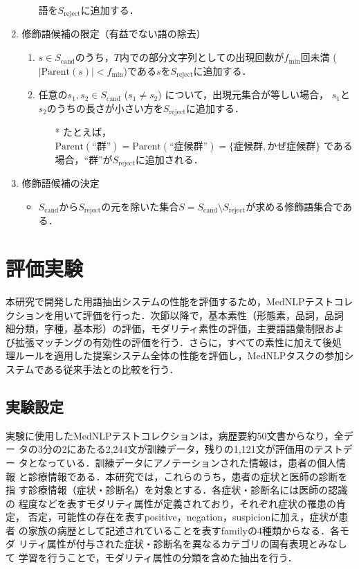\documentclass[japanese]{jnlp_1.4}
\begin{document}
\begin{enumerate}
\begin{enumerate}
	      語を$S_\mathrm{reject}$に追加する．
       \end{enumerate}
 \item 修飾語候補の限定（有益でない語の除去）
       \begin{enumerate}
	\item $s \in S_\mathrm{cand}$のうち，$T$内での部分文字列としての出現回数が$f_\mathrm{min}$回未満
	      ($|\mathrm{Parent}(s)|<f_\mathrm{min}$)である$s$を$S_\mathrm{reject}$に追加する．
	\item 任意の$s_1,s_2 \in S_\mathrm{cand}$ ($s_1 \neq s_2$) について，出現元集合が等しい場合，
	      $s_1$と$s_2$のうちの長さが小さい方を$S_\mathrm{reject}$に追加する．
	      \begin{itemize}
	       \item[*] たとえば，$\mathrm{Parent}(\mbox{``群''})=\mathrm{Parent}(\mbox{``症候群''})=\{\mbox{症候群},\mbox{かぜ症候群}\}$
		     である場合，``群''が$S_\mathrm{reject}$に追加される．
	      \end{itemize}
       \end{enumerate}
 \item 修飾語候補の決定
       \begin{itemize}
	\item $S_\mathrm{cand}$から$S_\mathrm{reject}$の元を除いた集合$S=S_\mathrm{cand} \setminus S_\mathrm{reject}$が求める修飾語集合である．
       \end{itemize}
\end{enumerate}


\section{評価実験}
\label{chp:experiments}

本研究で開発した用語抽出システムの性能を評価するため，MedNLPテストコレ
クションを用いて評価を行った．次節以降で，基本素性（形態素，品詞，品詞
細分類，字種，基本形）の評価，モダリティ素性の評価，主要語語彙制限およ
び拡張マッチングの有効性の評価を行う．さらに，すべての素性に加えて後処
理ルールを適用した提案システム全体の性能を評価し，MedNLPタスクの参加シ
ステムである従来手法との比較を行う．


\subsection{実験設定}

実験に使用したMedNLPテストコレクションは，病歴要約50文書からなり，全デー
タの3分の2にあたる2,244文が訓練データ，残りの1,121文が評価用のテストデー
タとなっている．訓練データにアノテーションされた情報は，患者の個人情報
と診療情報である．本研究では，これらのうち，患者の症状と医師の診断を指
す診療情報（症状・診断名）を対象とする．各症状・診断名には医師の認識の
程度などを表すモダリティ属性が定義されており，それぞれ症状の罹患の肯定，
否定，可能性の存在を表すpositive，negation，suspicionに加え，症状が患者
の家族の病歴として記述されていることを表すfamilyの4種類からなる．各モダ
リティ属性が付与された症状・診断名を異なるカテゴリの固有表現とみなして
学習を行うことで，モダリティ属性の分類を含めた抽出を行う．
\end{document}
